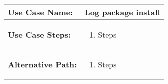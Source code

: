 \medskip

\begin{tabularx}{\linewidth}{|l|X|}
\hline
\textbf{Use Case Name:} & \textbf{Log package install} \\
\hline
\textbf{Use Case Steps:} & 
\begin{minipage}{\linewidth} 
  \vspace{0.05em}
  \begin{enumerate}
   \item Steps
  \end{enumerate}
  \vspace{0.05em}
\end{minipage}
\\
\hline 
\textbf{Alternative Path:} &
\begin{minipage}{\linewidth}
  \vspace{0.05em} 
  \begin{enumerate}
    \item Steps
  \end{enumerate}
  \vspace{0.05em} 
\end{minipage}
\\
\hline
\end{tabularx}

\newpage


